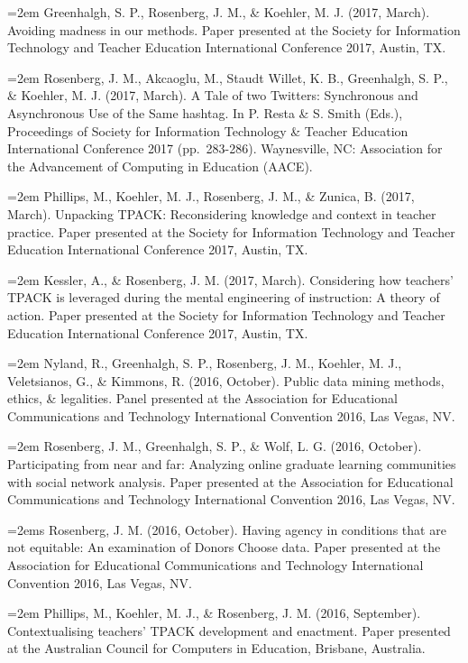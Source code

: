 \documentclass[]{article}
\begin{document}
\hangindent=2em Greenhalgh, S. P., Rosenberg, J. M., \& Koehler, M. J.
(2017, March). Avoiding madness in our methods. Paper presented at the
Society for Information Technology and Teacher Education International
Conference 2017, Austin, TX.

\hangindent=2em Rosenberg, J. M., Akcaoglu, M., Staudt Willet, K. B.,
Greenhalgh, S. P., \& Koehler, M. J. (2017, March). A Tale of two
Twitters: Synchronous and Asynchronous Use of the Same hashtag. In P.
Resta \& S. Smith (Eds.), Proceedings of Society for Information
Technology \& Teacher Education International Conference 2017
(pp.~283-286). Waynesville, NC: Association for the Advancement of
Computing in Education (AACE).

\hangindent=2em Phillips, M., Koehler, M. J., Rosenberg, J. M., \&
Zunica, B. (2017, March). Unpacking TPACK: Reconsidering knowledge and
context in teacher practice. Paper presented at the Society for
Information Technology and Teacher Education International Conference
2017, Austin, TX.

\hangindent=2em Kessler, A., \& Rosenberg, J. M. (2017, March).
Considering how teachers' TPACK is leveraged during the mental
engineering of instruction: A theory of action. Paper presented at the
Society for Information Technology and Teacher Education International
Conference 2017, Austin, TX.

\hangindent=2em Nyland, R., Greenhalgh, S. P., Rosenberg, J. M.,
Koehler, M. J., Veletsianos, G., \& Kimmons, R. (2016, October). Public
data mining methods, ethics, \& legalities. Panel presented at the
Association for Educational Communications and Technology International
Convention 2016, Las Vegas, NV.

\hangindent=2em Rosenberg, J. M., Greenhalgh, S. P., \& Wolf, L. G.
(2016, October). Participating from near and far: Analyzing online
graduate learning communities with social network analysis. Paper
presented at the Association for Educational Communications and
Technology International Convention 2016, Las Vegas, NV.

\hangindent=2ems Rosenberg, J. M. (2016, October). Having agency in
conditions that are not equitable: An examination of Donors Choose data.
Paper presented at the Association for Educational Communications and
Technology International Convention 2016, Las Vegas, NV.

\hangindent=2em Phillips, M., Koehler, M. J., \& Rosenberg, J. M. (2016,
September). Contextualising teachers' TPACK development and enactment.
Paper presented at the Australian Council for Computers in Education,
Brisbane, Australia.
\end{document}
